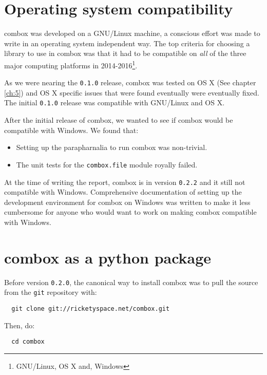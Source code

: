 \section{Operating system compatibility}\label{3-os-compat}

combox was developed on a GNU/Linux machine, a conscious effort was
made to write in an operating system independent way. The top criteria
for choosing a library to use in combox was that it had to be
compatible on \emph{all} of the three major computing platforms in
2014-2016\footnote{GNU/Linux, OS X and, Windows}.

As we were nearing the \verb+0.1.0+ release, combox was tested on OS X
(See chapter \ref{ch:5}) and OS X specific issues that were found
eventually were eventually fixed. The initial \verb+0.1.0+ release was
compatible with GNU/Linux and OS X.

After the initial release of combox, we wanted to see if combox would
be compatible with Windows. We found that:

\begin{itemize}
\item Setting up the parapharnalia to run combox was
  non-trivial\cite{doc:combox-setup-windoze}.
\item The unit tests for the \verb+combox.file+ module royally failed.
\end{itemize}

At the time of writing the report, combox is in version \verb+0.2.2+
and it still not compatible with Windows. Comprehensive documentation
of setting up the development environment for combox on Windows was
written\cite{doc:combox-setup-windoze} to make it less cumbersome for
anyone who would want to work on making combox compatible with
Windows.

\section{combox as a python package}\label{3-pypi}

Before version \verb+0.2.0+, the canonical way to install combox was
to pull the source from the \verb+git+ repository with:

\begin{verbatim}
  git clone git://ricketyspace.net/combox.git
\end{verbatim}

Then, do:

\begin{verbatim}
  cd combox
\end{verbatim}

